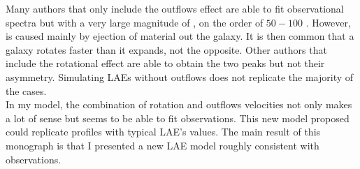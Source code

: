Many authors that only include the outflows effect are able to fit observational spectra but with a very large magnitude of \vout, on the order of $50-100$ \kms. However, \vout is caused mainly by ejection of material out the galaxy. It is then common that a galaxy rotates faster than it expands, not the opposite. Other authors that include the rotational effect are able to obtain the two peaks but not their asymmetry. Simulating LAEs without outflows does not replicate the majority of the cases. \\

In my model, the combination of rotation and outflows velocities not only makes a lot of sense but seems to be able to fit observations. This new model proposed could replicate \lya profiles with typical LAE's values. The main result of this monograph is that I presented a new LAE model roughly consistent with observations.\\